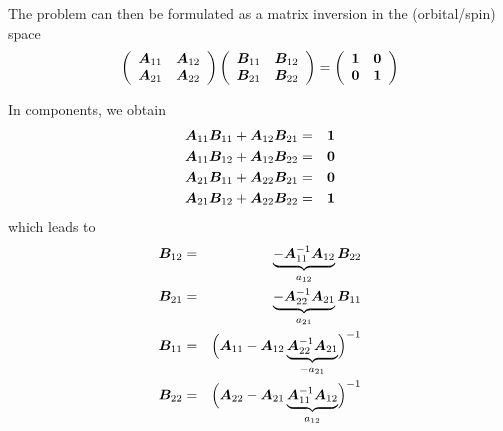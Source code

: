 \documentclass[11pt,a4paper]{report}
\begin{document}
The problem can then be formulated as a matrix inversion in the
(orbital/spin) space
\begin{eqnarray}
\left(\begin{array}{cc}
\bm{A}_{11}&\bm{A}_{12}\\\bm{A}_{21}&\bm{A}_{22}
\end{array}\right)
\left(\begin{array}{cc}
\bm{B}_{11}&\bm{B}_{12}\\\bm{B}_{21}&\bm{B}_{22}
\end{array}\right)
=
\left(\begin{array}{cc}
\bm{1}&\bm{0}\\\bm{0}&\bm{1}
\end{array}\right)
\end{eqnarray}

In components, we obtain
\begin{eqnarray}
\bm{A}_{11}\bm{B}_{11}+\bm{A}_{12}\bm{B}_{21}&=&\bm{1}
\nonumber\\
\bm{A}_{11}\bm{B}_{12}+\bm{A}_{12}\bm{B}_{22}&=&\bm{0}
\nonumber\\
\bm{A}_{21}\bm{B}_{11}+\bm{A}_{22}\bm{B}_{21}&=&\bm{0}
\nonumber\\
\bm{A}_{21}\bm{B}_{12}+\bm{A}_{22}\bm{B}_{22}&=&\bm{1}
\end{eqnarray}
which leads to
\begin{eqnarray}
\bm{B}_{12}&=&\underbrace{-\bm{A}_{11}^{-1}\bm{A}_{12}}_{a_{12}}\bm{B}_{22}
\nonumber\\
\bm{B}_{21}&=&\underbrace{-\bm{A}_{22}^{-1}\bm{A}_{21}}_{a_{21}}\bm{B}_{11}
\nonumber\\
\bm{B}_{11}&=&\Bigl(\bm{A}_{11}
-\bm{A}_{12}\underbrace{\bm{A}_{22}^{-1}\bm{A}_{21}}_{-a_{21}}\Bigr)^{-1}
\nonumber\\
\bm{B}_{22}&=&\Bigl(\bm{A}_{22}
-\bm{A}_{21}\underbrace{\bm{A}_{11}^{-1}\bm{A}_{12}}_{a_{12}}\Bigr)^{-1}
\nonumber
\end{eqnarray}
\end{document}

